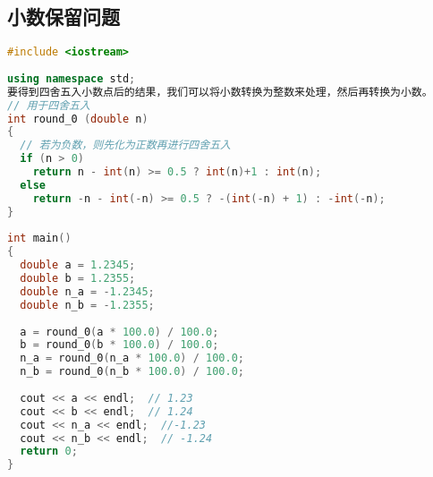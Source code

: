 \subsection{小数保留问题}
\begin{lstlisting}[language=C++]
#include <iostream>
 
using namespace std;
要得到四舍五入小数点后的结果，我们可以将小数转换为整数来处理，然后再转换为小数。
// 用于四舍五入
int round_0 (double n)
{
  // 若为负数，则先化为正数再进行四舍五入
  if (n > 0)
    return n - int(n) >= 0.5 ? int(n)+1 : int(n);
  else
    return -n - int(-n) >= 0.5 ? -(int(-n) + 1) : -int(-n);
}
 
int main()
{
  double a = 1.2345;
  double b = 1.2355;
  double n_a = -1.2345;
  double n_b = -1.2355;
 
  a = round_0(a * 100.0) / 100.0;
  b = round_0(b * 100.0) / 100.0;
  n_a = round_0(n_a * 100.0) / 100.0;
  n_b = round_0(n_b * 100.0) / 100.0;
 
  cout << a << endl;  // 1.23
  cout << b << endl;  // 1.24
  cout << n_a << endl;  //-1.23
  cout << n_b << endl;  // -1.24
  return 0;
}
\end{lstlisting}

